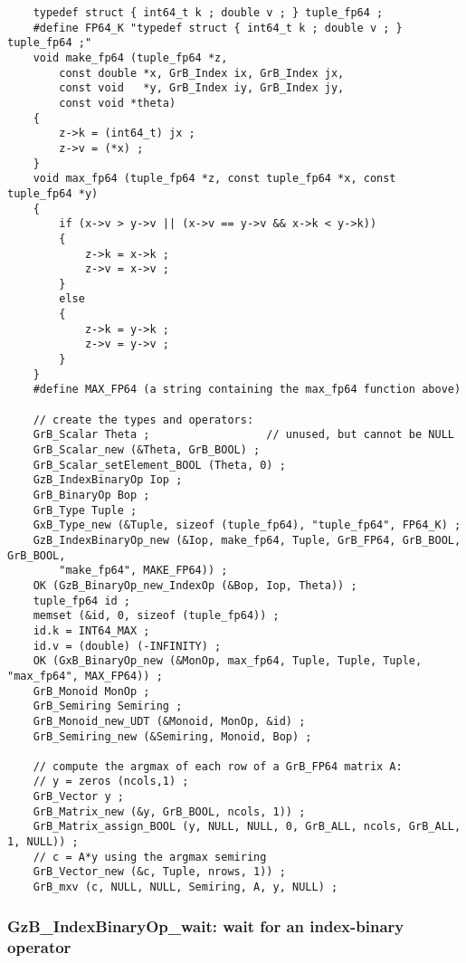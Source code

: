 \documentclass[12pt]{article}
\begin{document}
{\footnotesize
\begin{verbatim}
    typedef struct { int64_t k ; double v ; } tuple_fp64 ;
    #define FP64_K "typedef struct { int64_t k ; double v ; } tuple_fp64 ;"
    void make_fp64 (tuple_fp64 *z,
        const double *x, GrB_Index ix, GrB_Index jx,
        const void   *y, GrB_Index iy, GrB_Index jy,
        const void *theta)
    {
        z->k = (int64_t) jx ;
        z->v = (*x) ;
    }
    void max_fp64 (tuple_fp64 *z, const tuple_fp64 *x, const tuple_fp64 *y)
    {
        if (x->v > y->v || (x->v == y->v && x->k < y->k))
        {
            z->k = x->k ;
            z->v = x->v ;
        }
        else
        {
            z->k = y->k ;
            z->v = y->v ;
        }
    }
    #define MAX_FP64 (a string containing the max_fp64 function above)

    // create the types and operators:
    GrB_Scalar Theta ;                  // unused, but cannot be NULL
    GrB_Scalar_new (&Theta, GrB_BOOL) ;
    GrB_Scalar_setElement_BOOL (Theta, 0) ;
    GzB_IndexBinaryOp Iop ;
    GrB_BinaryOp Bop ;
    GrB_Type Tuple ;
    GxB_Type_new (&Tuple, sizeof (tuple_fp64), "tuple_fp64", FP64_K) ;
    GzB_IndexBinaryOp_new (&Iop, make_fp64, Tuple, GrB_FP64, GrB_BOOL, GrB_BOOL,
        "make_fp64", MAKE_FP64)) ;
    OK (GzB_BinaryOp_new_IndexOp (&Bop, Iop, Theta)) ;
    tuple_fp64 id ;
    memset (&id, 0, sizeof (tuple_fp64)) ;
    id.k = INT64_MAX ;
    id.v = (double) (-INFINITY) ;
    OK (GxB_BinaryOp_new (&MonOp, max_fp64, Tuple, Tuple, Tuple, "max_fp64", MAX_FP64)) ;
    GrB_Monoid MonOp ;
    GrB_Semiring Semiring ;
    GrB_Monoid_new_UDT (&Monoid, MonOp, &id) ;
    GrB_Semiring_new (&Semiring, Monoid, Bop) ;

    // compute the argmax of each row of a GrB_FP64 matrix A:
    // y = zeros (ncols,1) ;
    GrB_Vector y ;
    GrB_Matrix_new (&y, GrB_BOOL, ncols, 1)) ;
    GrB_Matrix_assign_BOOL (y, NULL, NULL, 0, GrB_ALL, ncols, GrB_ALL, 1, NULL)) ;
    // c = A*y using the argmax semiring
    GrB_Vector_new (&c, Tuple, nrows, 1)) ;
    GrB_mxv (c, NULL, NULL, Semiring, A, y, NULL) ; \end{verbatim}}

\newpage
\subsubsection{{\sf GzB\_IndexBinaryOp\_wait:} wait for an index-binary operator}
\label{idxbinop_wait}
\end{document}
